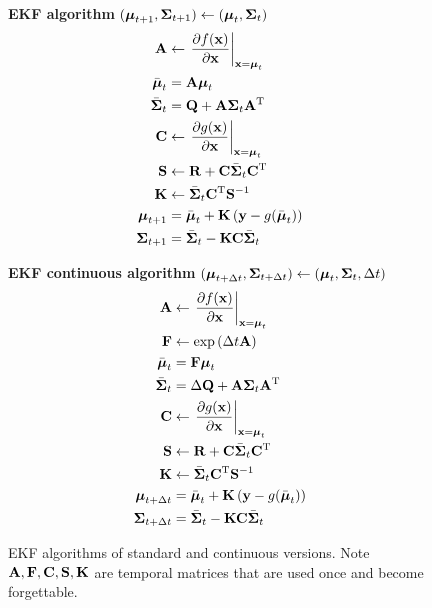 \documentclass{article}
\begin{document}
\begin{figure}
\begin{itembox}[l]{\bf EKF algorithm}
$({\boldsymbol{\mu}}_{t+1}, {\boldsymbol{\Sigma}}_{t+1}) \leftarrow ({\boldsymbol{\mu}}_t, {\boldsymbol{\Sigma}}_t)$
\begin{align*}
{\bf A} &\leftarrow \left. \frac{\partial f({\bf x})}{\partial {\bf x}} \right|_{{\bf x} = {\boldsymbol{\mu}}_t} \\
\bar{{\boldsymbol{\mu}}}_t &= {\bf A} {\boldsymbol{\mu}}_t \\
\bar{{\boldsymbol{\Sigma}}}_t &= {\bf Q} + {\bf A} {\boldsymbol{\Sigma}}_t {\bf A}{{}^{\rm T}}\\ 
{\bf C} &\leftarrow \left. \frac{\partial g({\bf x})}{\partial {\bf x}} \right|_{{\bf x} = {\boldsymbol{\mu}}_t} \\
{\bf S} &\leftarrow {\bf R} + {\bf C} \bar{{\boldsymbol{\Sigma}}}_t {\bf C}{{}^{\rm T}}\\
{\bf K} &\leftarrow \bar{{\boldsymbol{\Sigma}}}_t {\bf C}{{}^{\rm T}} {\bf S}^{-1}\\
{\boldsymbol{\mu}}_{t+1} &= \bar{{\boldsymbol{\mu}}}_t + {\bf K} \left( {\bf y}-g(\bar{{\boldsymbol{\mu}}}_t ) \right)\\
{\boldsymbol{\Sigma}}_{t+1} &= \bar{{\boldsymbol{\Sigma}}}_t - {\bf K} {\bf C} \bar{{\boldsymbol{\Sigma}}}_t
\end{align*}
\end{itembox}

\begin{itembox}[l]{\bf EKF continuous algorithm}
$({\boldsymbol{\mu}}_{t+\Delta t}, {\boldsymbol{\Sigma}}_{t+\Delta t}) \leftarrow ({\boldsymbol{\mu}}_t, {\boldsymbol{\Sigma}}_t, \Delta t)$
\begin{align*}
{\bf A} &\leftarrow \left. \frac{\partial f({\bf x})}{\partial {\bf x}} \right|_{{\bf x} = {\boldsymbol{\mu}}_t} \\
{\bf F} &\leftarrow \exp \left( \Delta t {\bf A} \right) \\
\bar{{\boldsymbol{\mu}}}_t &= {\bf F} {\boldsymbol{\mu}}_t \\
\bar{{\boldsymbol{\Sigma}}}_t &= \Delta{\bf Q} + {\bf A} {\boldsymbol{\Sigma}}_t {\bf A}{{}^{\rm T}}\\ 
{\bf C} &\leftarrow \left. \frac{\partial g({\bf x})}{\partial {\bf x}} \right|_{{\bf x} = {\boldsymbol{\mu}}_t} \\
{\bf S} &\leftarrow {\bf R} + {\bf C} \bar{{\boldsymbol{\Sigma}}}_t {\bf C}{{}^{\rm T}}\\
{\bf K} &\leftarrow \bar{{\boldsymbol{\Sigma}}}_t {\bf C}{{}^{\rm T}} {\bf S}^{-1}\\
{\boldsymbol{\mu}}_{t+\Delta t} &= \bar{{\boldsymbol{\mu}}}_t + {\bf K} \left( {\bf y}-g(\bar{{\boldsymbol{\mu}}}_t ) \right)\\
{\boldsymbol{\Sigma}}_{t+\Delta t} &= \bar{{\boldsymbol{\Sigma}}}_t - {\bf K} {\bf C} \bar{{\boldsymbol{\Sigma}}}_t
\end{align*}
\end{itembox}
\caption{EKF algorithms of standard and continuous versions.
Note ${\bf A}, {\bf F}, {\bf C}, {\bf S}, {\bf K}$ are temporal matrices
that are used once and become forgettable.}
\label{EKFalg}
\end{figure}
\end{document}
